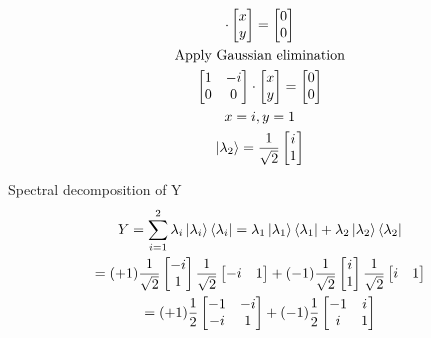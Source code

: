 \documentclass[]{article}
\begin{document}
\begin{enumerate}
\begin{enumerate}
\begin{minipage}{.45\linewidth}
\begin{gather*}
              \cdot 
              \begin{bmatrix}
                x\\ y
              \end{bmatrix}
              = \begin{bmatrix}
                0\\0
              \end{bmatrix}\\
              \text{Apply Gaussian elimination}\\
              \begin{bmatrix}
                1 & -i\\
                0 & 0
              \end{bmatrix}
              \cdot 
              \begin{bmatrix}
                x\\ y
              \end{bmatrix}
              = \begin{bmatrix}
                0\\0
              \end{bmatrix}\\
              x = i, y = 1\\
              \ket{\lambda_2} = \frac{1}{\sqrt{2}} \begin{bmatrix}
                i\\1
              \end{bmatrix}
            \end{gather*}
          \end{minipage}

          Spectral decomposition of Y
          \begin{gather*}
            Y = \sum_{i=1}^{2} \lambda_i \ket{\lambda_i}\bra{\lambda_i}
            = \lambda_1 \ket{\lambda_1}\bra{\lambda_1} + \lambda_2 \ket{\lambda_2}\bra{\lambda_2}\\
            = (+1) \frac{1}{\sqrt{2}} \begin{bmatrix}-i\\1\end{bmatrix}
            \frac{1}{\sqrt{2}} \begin{bmatrix}-i&1\end{bmatrix}
            + (-1) \frac{1}{\sqrt{2}} \begin{bmatrix}i\\1\end{bmatrix}
            \frac{1}{\sqrt{2}} \begin{bmatrix}i&1\end{bmatrix}\\
            = (+1) \frac{1}{2} \begin{bmatrix}-1&-i\\-i&1\end{bmatrix} 
            + (-1) \frac{1}{2}\begin{bmatrix}-1&i\\i&1\end{bmatrix}
          \end{gather*}


\end{enumerate}
\end{enumerate}
\end{document}
